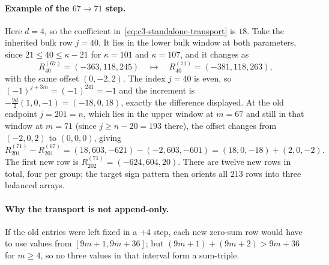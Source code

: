\paragraph{Example of the $67\to71$ step.}
Here $d=4$, so the coefficient in~\eqref{eq:c3-standalone-transport} is $18$.
Take the inherited bulk row $j=40$. It lies in the lower bulk window at both parameters,
since $21\le40\le\kappa-21$ for $\kappa=101$ and $\kappa=107$, and it changes as
\[
 R_{40}^{(67)}=(-363,118,245)
 \quad\longmapsto\quad R_{40}^{(71)}=(-381,118,263),
\]
with the same offset $(0,-2,2)$. The index $j=40$ is even, so $(-1)^{j+3m}=(-1)^{241}=-1$ and the
increment is $-\tfrac{9d}{2}(1,0,-1)=(-18,0,18)$, exactly the difference displayed. At the old
endpoint $j=201=n$, which lies in the upper window at $m=67$ and still in that window at $m=71$
(since $j\ge n-20=193$ there), the offset changes from
$(-2,0,2)$ to $(0,0,0)$, giving
\[
 R_{201}^{(71)}-R_{201}^{(67)}
 =(18,603,-621)-(-2,603,-601)
 =(18,0,-18)+(2,0,-2).
\]
The first new row is $R_{202}^{(71)}=(-624,604,20)$. There are twelve new rows in total,
four per group; the target sign pattern then orients all $213$ rows into three balanced arrays.

\paragraph{Why the transport is not append-only.}
If the old entries were left fixed in a $+4$ step,
each new zero-sum row would have to use values from $[9m+1,9m+36]$; but
$(9m+1)+(9m+2)>9m+36$ for $m\ge4$, so no three values in that interval form a sum-triple.

